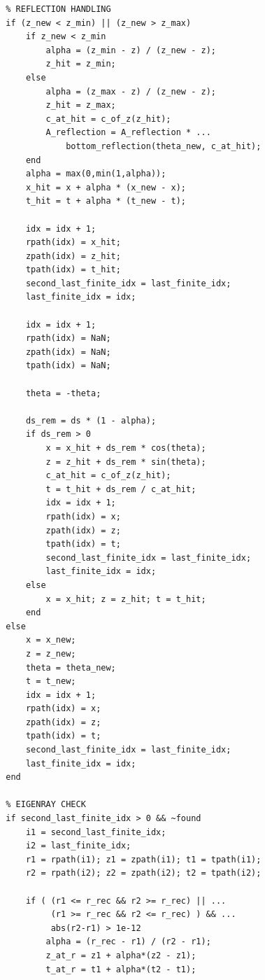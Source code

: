 \documentclass[fleqn]{jaes}
\begin{document}
\begin{verbatim}
        % REFLECTION HANDLING
        if (z_new < z_min) || (z_new > z_max)
            if z_new < z_min
                alpha = (z_min - z) / (z_new - z);
                z_hit = z_min;
            else
                alpha = (z_max - z) / (z_new - z);
                z_hit = z_max;
                c_at_hit = c_of_z(z_hit);
                A_reflection = A_reflection * ...
                    bottom_reflection(theta_new, c_at_hit);
            end
            alpha = max(0,min(1,alpha));
            x_hit = x + alpha * (x_new - x);
            t_hit = t + alpha * (t_new - t);

            idx = idx + 1;
            rpath(idx) = x_hit;
            zpath(idx) = z_hit;
            tpath(idx) = t_hit;
            second_last_finite_idx = last_finite_idx;
            last_finite_idx = idx;

            idx = idx + 1;
            rpath(idx) = NaN;
            zpath(idx) = NaN;
            tpath(idx) = NaN;

            theta = -theta;

            ds_rem = ds * (1 - alpha);
            if ds_rem > 0
                x = x_hit + ds_rem * cos(theta);
                z = z_hit + ds_rem * sin(theta);
                c_at_hit = c_of_z(z_hit);
                t = t_hit + ds_rem / c_at_hit;
                idx = idx + 1;
                rpath(idx) = x;
                zpath(idx) = z;
                tpath(idx) = t;
                second_last_finite_idx = last_finite_idx;
                last_finite_idx = idx;
            else
                x = x_hit; z = z_hit; t = t_hit;
            end
        else
            x = x_new;
            z = z_new;
            theta = theta_new;
            t = t_new;
            idx = idx + 1;
            rpath(idx) = x;
            zpath(idx) = z;
            tpath(idx) = t;
            second_last_finite_idx = last_finite_idx;
            last_finite_idx = idx;
        end

        % EIGENRAY CHECK
        if second_last_finite_idx > 0 && ~found
            i1 = second_last_finite_idx;
            i2 = last_finite_idx;
            r1 = rpath(i1); z1 = zpath(i1); t1 = tpath(i1);
            r2 = rpath(i2); z2 = zpath(i2); t2 = tpath(i2);

            if ( (r1 <= r_rec && r2 >= r_rec) || ...
                 (r1 >= r_rec && r2 <= r_rec) ) && ...
                 abs(r2-r1) > 1e-12
                alpha = (r_rec - r1) / (r2 - r1);
                z_at_r = z1 + alpha*(z2 - z1);
                t_at_r = t1 + alpha*(t2 - t1);


\end{verbatim}
\end{document}
